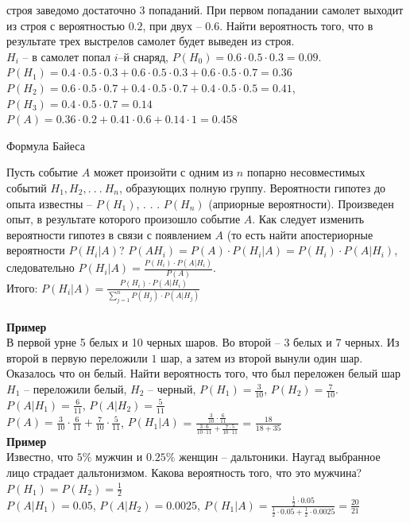 \documentclass[russian, 12pt, fleqn]{article}
\begin{document}
 строя заведомо достаточно 3 попаданий. При первом попадании самолет выходит из строя с вероятностью $0.2$, при двух -- $0.6$. Найти вероятность того, что в результате трех выстрелов самолет будет выведен из строя.\\
$H_i$ -- в самолет попал $i$--й снаряд, $P(H_0)=0.6\cdot0.5\cdot0.3=0.09$. $P(H_1)=0.4\cdot0.5\cdot0.3+0.6\cdot0.5\cdot0.3+0.6\cdot0.5\cdot0.7=0.36$\\
$P(H_2)=0.6\cdot0.5\cdot 0.7+0.4\cdot0.5\cdot0.7+0.4\cdot0.5\cdot0.5=0.41$, $P(H_3)=0.4\cdot0.5\cdot0.7=0.14$\\
$P(A)=0.36\cdot0.2+0.41\cdot0.6+0.14\cdot1=0.458$\\
\begin{center}
$\textbf{Формула Байеса }$
\end{center}
Пусть событие $A$ может произойти с одним из $n$ попарно несовместимых событий $H_1, H_2, .\ .\ .\ H_n$, образующих полную группу. Вероятности гипотез до опыта известны -- $P(H_1)$, . . . $P(H_n)$ (априорные вероятности). Произведен опыт, в результате которого произошло событие $A$. Как следует изменить вероятности гипотез в связи с появлением $A$ (то есть найти апостериорные вероятности $P(H_i|A)$?
$P(AH_i)=P(A)\cdot P(H_i|A) = P(H_i) \cdot P(A|H_i)$, следовательно $P(H_i|A) = \frac{P(H_i) \cdot P(A|H_i)}{P(A)}$.\\
Итого: $P(H_i|A) = \frac{P(H_i)\cdot P(A|H_i)}{ \sum\limits_{j=1}^{n}P(H_j)\cdot P(A|H_j) }$\\
\\
\textbf{Пример\ }\\
В первой урне 5 белых и 10 черных шаров. Во второй -- 3 белых и 7 черных. Из второй в первую переложили $1$ шар, а затем из второй вынули один шар. Оказалось что он белый. Найти вероятность того, что был переложен белый шар\\
$H_1$ -- переложили белый, $H_2$ -- черный, $P(H_1)=\frac{3}{10}$, $P(H_2)=\frac{7}{10}$. $P(A|H_1)=\frac{6}{11}$, $P(A|H_2)=\frac{5}{11}$\\
 $P(A)=\frac{3}{10}\cdot \frac{6}{11} + \frac{7}{10} \cdot \frac{5}{11}$, $P(H_1|A)$ = $\frac {\frac{3}{10}\cdot \frac{6}{11} }   {\frac{3\cdot 6}{10\cdot11} + \frac{7\cdot5}{10\cdot11}  }$ = $\frac{18}{18 + 35}$\\
\textbf{Пример\ }\\
Известно, что $5\%$ мужчин и $0.25\%$ женщин -- дальтоники. Наугад выбранное лицо страдает дальтонизмом. Какова вероятность того, что это мужчина?\\
$P(H_1) = P(H_2) = \frac{1}{2}$\\
$P(A|H_1) = 0.05$, $P(A|H_2) = 0.0025$, $P(H_1|A) = \frac{\frac{1}{2} \cdot 0.05}{ \frac{1}{2} \cdot 0.05 + \frac{1}{2} \cdot 0.0025 } = \frac{20}{21}$\\
\end{document}
